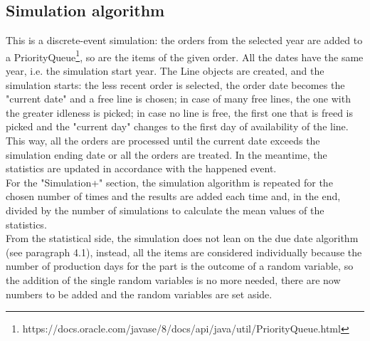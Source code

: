 \documentclass[a4paper,12pt]{article}
\begin{document}
\subsection{Simulation algorithm}
 This is a discrete-event simulation: the orders from the selected year are added to a PriorityQueue\footnote{https://docs.oracle.com/javase/8/docs/api/java/util/PriorityQueue.html}, so are the items of the given order. All the dates have the same year, i.e. the simulation start year. The Line objects are created, and the simulation starts: the less recent order is selected, the order date becomes the "current date" and a free line is chosen; in case of many free lines, the one with the greater idleness is picked; in case no line is free, the first one that is freed is picked and the "current day" changes to the first day of availability of the line. This way, all the orders are processed until the current date exceeds the simulation ending date or all the orders are treated. In the meantime, the statistics are updated in accordance with the happened event. \\
For the "Simulation+" section, the simulation algorithm is repeated for the chosen number of times and the results are added each time and, in the end, divided by the number of simulations to calculate the mean values of the statistics.\\
From the statistical side, the simulation does not lean on the due date algorithm (see paragraph 4.1), instead, all the items are considered individually because the number of production days for the part  is the outcome of a random variable, so the addition of the single random variables is no more needed, there are now numbers to be added and the random variables are set aside.

\newpage
\end{document}
